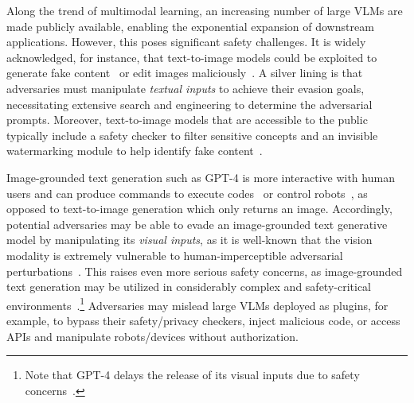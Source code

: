 Along the trend of multimodal learning, an increasing number of large VLMs are made publicly available, enabling the exponential expansion of downstream applications. However, this poses significant safety challenges. It is widely acknowledged, for instance, that text-to-image models could be exploited to generate fake content~\citep{ricker2022towards,sha2022fake} or edit images maliciously~\citep{salman2023raising}. A silver lining is that adversaries must manipulate \emph{textual inputs} to achieve their evasion goals, necessitating extensive search and engineering to determine the adversarial prompts. Moreover, text-to-image models that are accessible to the public typically include a safety checker to filter sensitive concepts and an invisible watermarking module to help identify fake content~\citep{rando2022red,rombach2022high,zhao2023recipe}.

Image-grounded text generation such as GPT-4 is more interactive with human users and can produce commands to execute codes~\citep{copilot} or control robots~\citep{vemprala2023chatgpt}, as opposed to text-to-image generation which only returns an image. Accordingly, potential adversaries may be able to evade an image-grounded text generative model by manipulating its \emph{visual inputs}, as it is well-known that the vision modality is extremely vulnerable to human-imperceptible adversarial perturbations~\citep{biggio2013evasion,Dong2017,Goodfellow2014,Szegedy2013}. This raises even more serious safety concerns, as image-grounded text generation may be utilized in considerably complex and safety-critical environments~\citep{park2023generative}.\footnote{Note that GPT-4 delays the release of its visual inputs due to safety concerns~\citep{delaygpt4}.} Adversaries may mislead large VLMs deployed as plugins, for example, to bypass their safety/privacy checkers, inject malicious code, or access APIs and manipulate robots/devices without authorization.

